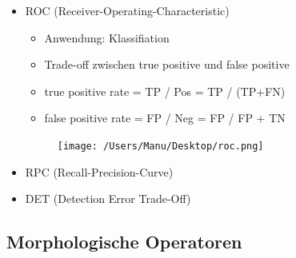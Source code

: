 \documentclass[paper=a4, fontsize=11pt]{scrartcl} %
\numberwithin{equation}{section} %
\numberwithin{figure}{section} %
\numberwithin{table}{section} %
\begin{document}
\begin{itemize}
\item ROC (Receiver-Operating-Characteristic)\\
\begin{minipage}{0.6\textwidth}
\begin{itemize}
\item Anwendung: Klassifiation
\item Trade-off zwischen true positive und false positive
\item true positive rate = TP / Pos = TP / (TP+FN)
\item false positive rate = FP / Neg = FP / FP + TN
\end{itemize}
\end{minipage} \hfill
\begin{minipage}{0.35\textwidth}
\begin{figure}[H]
\texttt{[image: /Users/Manu/Desktop/roc.png]}
\end{figure}
\end{minipage}
\item RPC (Recall-Precision-Curve)
\item DET (Detection Error Trade-Off)
\end{itemize}

\subsection{Morphologische Operatoren}
\end{document}
